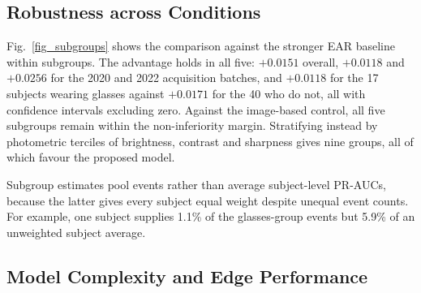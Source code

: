 \documentclass{IEEE_lsens}
\begin{document}
\subsection{Robustness across Conditions}
Fig.~\ref{fig_subgroups} shows the comparison against the stronger EAR
baseline within subgroups. The advantage holds in all five: $+0.0151$
overall, $+0.0118$ and $+0.0256$ for the 2020 and 2022 acquisition
batches, and $+0.0118$ for the 17 subjects wearing glasses against
$+0.0171$ for the 40 who do not, all with confidence intervals excluding
zero. Against the image-based control, all five subgroups remain within
the non-inferiority margin. Stratifying instead by photometric terciles
of brightness, contrast and sharpness gives nine groups, all of which
favour the proposed model.

Subgroup estimates pool events rather than average subject-level PR-AUCs,
because the latter gives every subject equal weight despite unequal event
counts. For example, one subject supplies 1.1\% of the glasses-group
events but 5.9\% of an unweighted subject average.

\subsection{Model Complexity and Edge Performance}
\label{sec_edge}
\end{document}
